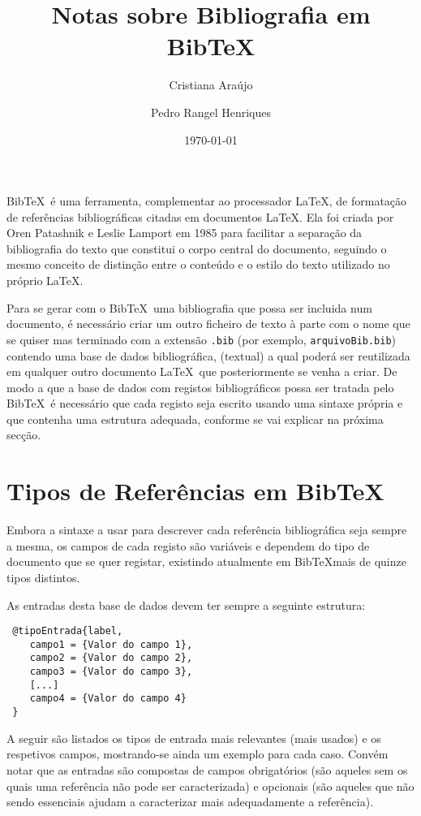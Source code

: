 \documentclass{article}%
\title{Notas sobre  Bibliografia em  Bib\TeX} %
\author{Cristiana Araújo \and Pedro Rangel Henriques} %
\date{ \today} %
\begin{document}

\maketitle %

Bib\TeX\ é uma ferramenta, complementar ao processador \LaTeX,  de formatação de referências bibliográficas
citadas em documentos \LaTeX.
Ela foi criada por Oren Patashnik e Leslie Lamport em 1985 para facilitar a separação da bibliografia
do texto que constitui o corpo central do documento,
seguindo o mesmo conceito de distinção entre o conteúdo e o estilo do texto utilizado no próprio \LaTeX.

Para se gerar com o Bib\TeX\ uma bibliografia que possa ser incluida num documento, é necessário criar
um outro ficheiro de texto à parte com o nome que se quiser mas terminado com a extensão \texttt{.bib}
(por exemplo, \texttt{arquivoBib.bib}) contendo uma base de dados bibliográfica, (textual) a qual poderá ser reutilizada
em qualquer outro documento \LaTeX\ que posteriormente se venha a criar.
De modo a que a base de dados com registos bibliográficos possa ser tratada pelo Bib\TeX\ é necessário
que cada registo seja escrito usando uma sintaxe própria e que contenha uma estrutura adequada, conforme se
vai explicar na próxima secção.

\section{Tipos de Referências em Bib\TeX} \label{sec:bibliografia} %

Embora a sintaxe a usar para descrever cada referência bibliográfica seja sempre a mesma, os campos de cada registo
são variáveis e dependem do tipo de documento que se quer registar, existindo atualmente em Bib\TeX mais de quinze tipos distintos.

As entradas desta base de dados devem ter sempre a seguinte estrutura:

\begin{verbatim}
 @tipoEntrada{label,
    campo1 = {Valor do campo 1},
    campo2 = {Valor do campo 2},
    campo3 = {Valor do campo 3},
    [...]
    campo4 = {Valor do campo 4}
 }
\end{verbatim}

A seguir são listados os tipos de entrada mais relevantes (mais usados)  e os respetivos campos, mostrando-se ainda um exemplo para cada caso.
Convém notar que as entradas são compostas de campos obrigatórios (são aqueles sem os quais uma referência não
pode ser caracterizada) e
opcionais (são aqueles que não sendo essenciais ajudam a caracterizar mais adequadamente a referência).
\end{document}
